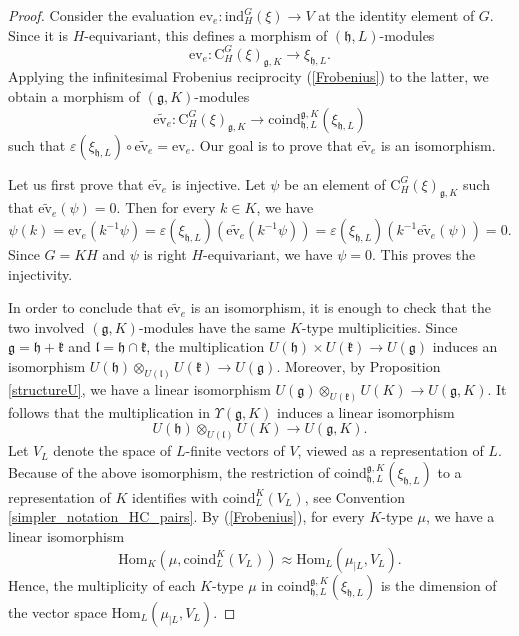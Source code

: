 \documentclass{amsart}
\theoremstyle{definition}
\begin{document}
\begin{proof}
    Consider the evaluation $\mathrm{ev}_e : \mathrm{ind}_H^G(\xi) \to V$ at the identity element of $G$. Since it is $H$-equivariant, this defines a morphism of $(\mathfrak{h},L)$-modules \begin{equation*}
        \mathrm{ev}_e : \mathrm{C}_H^G(\xi)_{\mathfrak{g},K} \to \xi_{\mathfrak{h},L}.
    \end{equation*}
    Applying the infinitesimal Frobenius reciprocity (\ref{Frobenius}) to the latter, we obtain a morphism of $(\mathfrak{g},K)$-modules
    \[\widetilde{\mathrm{ev}_e} : \mathrm{C}_H^G(\xi)_{\mathfrak{g},K} \longrightarrow \text{coind}_{\mathfrak{h},L}^{\mathfrak{g},K}(\xi_{\mathfrak{h},L})\]
    such that $\varepsilon(\xi_{\mathfrak{h},L}) \circ \widetilde{\mathrm{ev}_e} =  \mathrm{ev}_e$. Our goal is to prove that $\widetilde{\mathrm{ev}_e}$ is an isomorphism.

    Let us first prove that $\widetilde{\mathrm{ev}_e}$ is injective. Let $\psi$ be an element of $\mathrm{C}_H^G(\xi)_{\mathfrak{g},K}$ such that $\widetilde{\mathrm{ev}_e}(\psi) = 0$. Then for every $k \in K$, we have \[\psi(k) = \mathrm{ev}_e(k^{-1}\psi) = \varepsilon(\xi_{\mathfrak{h},L})(\widetilde{\mathrm{ev}_e}(k^{-1}\psi)) = \varepsilon(\xi_{\mathfrak{h},L})(k^{-1}\widetilde{\mathrm{ev}_e}(\psi)) = 0.\] Since $G = KH$ and $\psi$ is right $H$-equivariant, we have $\psi = 0$. This proves the injectivity.

    In order to conclude that $\widetilde{\mathrm{ev}_e}$ is an isomorphism, it is enough to check that the two involved $(\mathfrak{g},K)$-modules have the same $K$-type multiplicities. Since $\mathfrak{g} = \mathfrak{h} + \mathfrak{k}$ and $\mathfrak{l} = \mathfrak{h} \cap \mathfrak{k}$, the multiplication $U(\mathfrak{h}) \times U(\mathfrak{k}) \to U(\mathfrak{g})$ induces an isomorphism $U(\mathfrak{h}) \otimes_{U(\mathfrak{l})} U(\mathfrak{k}) \to U(\mathfrak{g})$. Moreover, by Proposition \ref{structureU}, we have a linear isomorphism $U(\mathfrak{g}) \otimes_{U(\mathfrak{k})} U(K) \to U(\mathfrak{g},K)$. It follows that the multiplication in $\Upsilon(\mathfrak{g},K)$ induces a linear isomorphism \begin{equation*} U(\mathfrak{h}) \otimes_{U(\mathfrak{l})} U(K) \longrightarrow U(\mathfrak{g},K).\end{equation*} Let $V_L$ denote the space of $L$-finite vectors of $V$, viewed as a representation of $L$. Because of the above isomorphism, the restriction of
    \(\text{coind}_{\mathfrak{h},L}^{\mathfrak{g},K}(\xi_{\mathfrak{h},L})\) to a representation of $K$ identifies with $\text{coind}^{K}_{L}(V_L)$, see Convention \ref{simpler_notation_HC_pairs}. By (\ref{Frobenius}), for every $K$-type $\mu$, we have a linear isomorphism
    \[\mathrm{Hom}_{K}(\mu, \text{coind}^{K}_{L}(V_L)) \approx \mathrm{Hom}_{L}(\mu_{|L}, V_L).\]
    Hence, the multiplicity of each $K$-type $\mu$ in $\text{coind}_{\mathfrak{h},L}^{\mathfrak{g},K}(\xi_{\mathfrak{h},L} )$ is the dimension of the vector space $\mathrm{Hom}_{L}(\mu_{|L}, V_L)$.


\end{proof}
\end{document}
